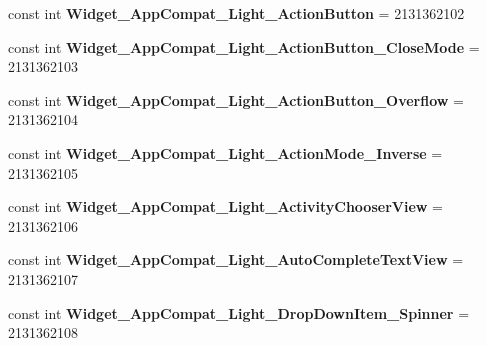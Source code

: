 \begin{DoxyCompactItemize}
\item 
\mbox{\label{class_sample_app_1_1_droid_1_1_resource_1_1_style_ae2f7c9462b1692a03393fce261c860c5}} 
const int {\bfseries Widget\+\_\+\+App\+Compat\+\_\+\+Light\+\_\+\+Action\+Button} = 2131362102
\item 
\mbox{\label{class_sample_app_1_1_droid_1_1_resource_1_1_style_a4bbe14fdd39f361d35d8ee11491e44af}} 
const int {\bfseries Widget\+\_\+\+App\+Compat\+\_\+\+Light\+\_\+\+Action\+Button\+\_\+\+Close\+Mode} = 2131362103
\item 
\mbox{\label{class_sample_app_1_1_droid_1_1_resource_1_1_style_acddce1e32b621e94efe5a82a746fff34}} 
const int {\bfseries Widget\+\_\+\+App\+Compat\+\_\+\+Light\+\_\+\+Action\+Button\+\_\+\+Overflow} = 2131362104
\item 
\mbox{\label{class_sample_app_1_1_droid_1_1_resource_1_1_style_a2aad2db186d77b9b6aac8747a83d5542}} 
const int {\bfseries Widget\+\_\+\+App\+Compat\+\_\+\+Light\+\_\+\+Action\+Mode\+\_\+\+Inverse} = 2131362105
\item 
\mbox{\label{class_sample_app_1_1_droid_1_1_resource_1_1_style_ae6e83c0864db8c2d14c6914c62c21e58}} 
const int {\bfseries Widget\+\_\+\+App\+Compat\+\_\+\+Light\+\_\+\+Activity\+Chooser\+View} = 2131362106
\item 
\mbox{\label{class_sample_app_1_1_droid_1_1_resource_1_1_style_a77a36a29945541f2d8b06eb67930f0d1}} 
const int {\bfseries Widget\+\_\+\+App\+Compat\+\_\+\+Light\+\_\+\+Auto\+Complete\+Text\+View} = 2131362107
\item 
\mbox{\label{class_sample_app_1_1_droid_1_1_resource_1_1_style_a1a0a72f71f98d003ddcbe232d97ae767}} 
const int {\bfseries Widget\+\_\+\+App\+Compat\+\_\+\+Light\+\_\+\+Drop\+Down\+Item\+\_\+\+Spinner} = 2131362108
\item 
\mbox{\label{class_sample_app_1_1_droid_1_1_resource_1_1_style_a2cc8a03f83b68cde358cee20fcb44f35}} 

\end{DoxyCompactItemize}
